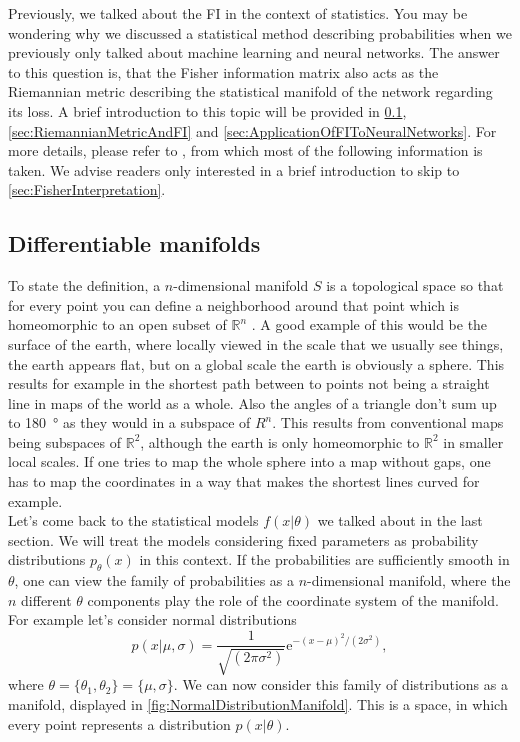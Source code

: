Previously, we talked about the FI in the context of statistics. You may be wondering why we discussed a statistical method describing probabilities when we previously only talked about machine learning and neural networks. The answer to this question is, that the Fisher information matrix also
acts as the Riemannian metric describing the statistical manifold of the network regarding its loss. A brief introduction to this topic will be provided in \cref{sec:Manifolds}, \cref{sec:RiemannianMetricAndFI} and \cref{sec:ApplicationOfFIToNeuralNetworks}. For more details, please refer to \cite{AmarisLectureNotes}, from which most of the following information is taken. We advise readers only interested in a brief introduction to skip to \cref{sec:FisherInterpretation}.

\subsection{Differentiable manifolds}\label{sec:Manifolds}
To state the definition, a $n$-dimensional manifold $S$ is a topological space so that for every point you can define a neighborhood around that point which is homeomorphic to an open subset of $\mathbb{R}^n$ \cite{AmarisLectureNotes}. A good example of this would be the surface of the earth, where locally viewed in the scale that we usually see things, the earth appears flat, but on a global scale the earth is obviously a sphere. This results for example in the shortest path between to points not being a straight line in maps of the world as a whole. Also the angles of a triangle don't sum up to \SI{180}{\degree} as they would in a subspace of $R^n$. This results from conventional maps being subspaces of $\mathbb{R}^2$, although the earth is only homeomorphic to $\mathbb{R}^2$ in smaller local scales. If one tries to map the whole sphere into a map without gaps, one has to map the coordinates in a way that makes the shortest lines curved for example.\\
Let's come back to the statistical models $f(x|\theta)$ we talked about in the last section. We will treat the models considering fixed parameters as probability distributions $p_\theta(x)$ in this context. If the probabilities are sufficiently smooth in $\theta$, one can view the family of probabilities as a $n$-dimensional manifold, where the $n$ different $\theta$ components play the role of the coordinate system of the manifold. \\
For example let's consider normal distributions 
\begin{equation}
	p(x|\mu,\sigma) = \frac{1}{\sqrt{(2\pi\sigma^2)}} \mathrm{e}^{-(x-\mu)^2/(2\sigma^2)},
\end{equation}
where $\theta = \{\theta_1,\theta_2\} = \{\mu,\sigma\}$. We can now consider this family of distributions as a manifold, displayed in \cref{fig:NormalDistributionManifold}. This is a space, in which every point represents a distribution $p(x|\theta)$.

